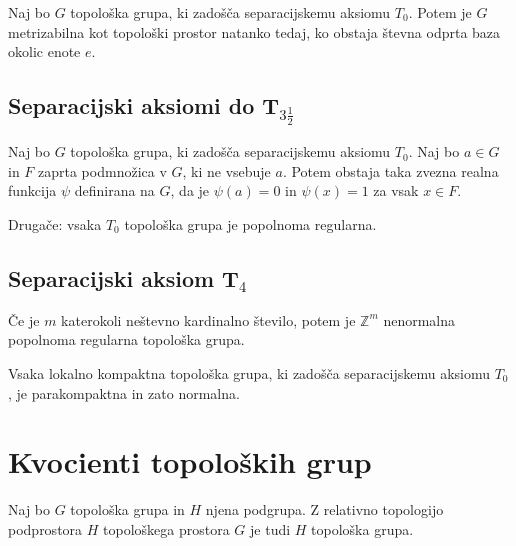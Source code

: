 \documentclass[mat1]{fmfdelo}
\newcommand{\Z}{\mathbb Z}
\begin{document}
\begin{izrek}\label{izr:metrizabilnost}
Naj bo $G$ topološka grupa, ki zadošča separacijskemu aksiomu $T_0$. Potem je $G$ metrizabilna kot topološki prostor natanko tedaj, ko obstaja števna odprta baza okolic enote $e$.
\end{izrek}

\subsection{Separacijski aksiomi do T$_{3 \frac{1}{2}}$}

\begin{izrek}\label{izr:t3pol}
Naj bo $G$ topološka grupa, ki zadošča separacijskemu aksiomu $T_0$. Naj bo $a \in G$ in $F$ zaprta podmnožica v $G$, ki ne vsebuje $a$. Potem obstaja taka zvezna realna funkcija $\psi$ definirana na $G$, da je $\psi (a) = 0$ in $\psi (x) = 1$ za vsak $x \in F$.

Drugače: vsaka $T_0$ topološka grupa je popolnoma regularna.
\end{izrek}

\subsection{Separacijski aksiom T$_4$}
\begin{izrek}\label{izr:t4protiprimer}
Če je $m$ katerokoli neštevno kardinalno število, potem je $\Z^{m}$ nenormalna popolnoma regularna topološka grupa.
\end{izrek}

\begin{izrek}\label{izr:t4}
Vsaka lokalno kompaktna topološka grupa, ki zadošča separacijskemu aksiomu $T_0$, je parakompaktna in zato normalna.
\end{izrek}

\section{Kvocienti topoloških grup}

\begin{trditev}\label{trd:toppodgrupa}
Naj bo $G$ topološka grupa in $H$ njena podgrupa. Z relativno topologijo podprostora $H$ topološkega prostora $G$ je tudi $H$ topološka grupa.
\end{trditev}
\end{document}
